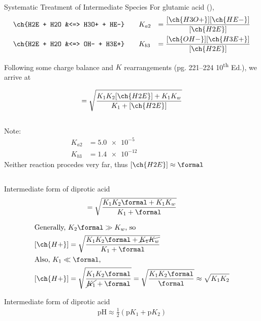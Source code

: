\documentclass[notes=hide]{beamer}
\begin{document}
\begin{frame}[allowframebreaks]{Systematic Treatment of Intermediate Species}
	For glutamic acid (),
	\begin{align*}
		\ch{H2E + H2O &<=> H3O+ + HE-} &\qquad K_{a2} &=
		\frac{[\ch{H3O+}][\ch{HE-}]}{[\ch{H2E}]} \\
		\ch{H2E + H2O &<=> OH- + H3E+} &\qquad K_{b3} &=
		\frac{[\ch{OH-}][\ch{H3E+}]}{[\ch{H2E}]}
	\end{align*}

	Following some charge balance and $K$ rearrangements (pg. 221--224
	10\textsuperscript{th} Ed.), we arrive at

	\begin{align*}
		[\ch{H+}] = \sqrt{\frac{K_1K_2[\ch{H2E}] + K_1K_w}{K_1 +
		[\ch{H2E}]}}
	\end{align*}

	\framebreak

	\begin{columns}
		Note:
		\begin{align*}
			K_{a2} &= \num{5.0e-5} \\
			K_{b3} &= \num{1.4e-12}
		\end{align*}
		Neither reaction procedes very far, thus
		$[\ch{H2E}] \approx \si{\formal}$
	\end{columns}

	\bigskip

	\begin{block}{Intermediate form of diprotic acid}
		\begin{align*}
			[\ch{H+}] = \sqrt{\frac{K_1K_2\si{\formal} + K_1K_w}{K_1
			+ \si{\formal}}}
		\end{align*}
	\end{block}

	\framebreak

	\begin{align*}
		\intertext{Generally, $K_2\si{\formal} \gg K_w$, so}
		[\ch{H+}] &= \sqrt{\frac{K_1K_2\si{\formal} +
		\cancel{K_1K_w}}{K_1 + \si{\formal}}} \\
		\intertext{Also, $K_1 \ll \si{\formal}$,}
		[\ch{H+}] &= \sqrt{\frac{K_1K_2\si{\formal}}{\cancel{K_1} +
		\si{\formal}}} = \sqrt{\frac{K_1K_2\si{\formal}}{\si{\formal}}}
		\approx \sqrt{K_1K_2} \\
	\end{align*}

	\begin{block}{Intermediate form of diprotic acid}
		\begin{align*}
			\text{pH} \approx \frac{1}{2}(\text{p}K_1 + \text{p}K_2)
		\end{align*}
	\end{block}
\end{frame}
\end{document}
